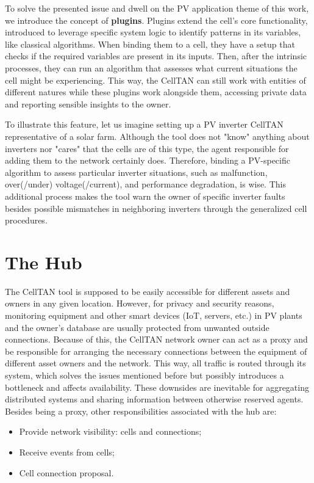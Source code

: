 To solve the presented issue and dwell on the PV application theme of this work, we introduce the concept of \textbf{plugins}. Plugins extend the cell's core functionality, introduced to leverage specific system logic to identify patterns in its variables, like classical algorithms. When binding them to a cell, they have a setup that checks if the required variables are present in its inputs. Then, after the intrinsic processes, they can run an algorithm that assesses what current situations the cell might be experiencing. This way, the CellTAN can still work with entities of different natures while these plugins work alongside them, accessing private data and reporting sensible insights to the owner. 

To illustrate this feature, let us imagine setting up a PV inverter CellTAN representative of a solar farm. Although the tool does not "know" anything about inverters nor "cares" that the cells are of this type, the agent responsible for adding them to the network certainly does. Therefore, binding a PV-specific algorithm to assess particular inverter situations, such as malfunction, over(/under) voltage(/current), and performance degradation, is wise. This additional process makes the tool warn the owner of specific inverter faults besides possible mismatches in neighboring inverters through the generalized cell procedures.

\section{The Hub}

The CellTAN tool is supposed to be easily accessible for different assets and owners in any given location. However, for privacy and security reasons, monitoring equipment and other smart devices (IoT, servers, etc.) in PV plants and the owner's database are usually protected from unwanted outside connections. Because of this, the CellTAN network owner can act as a proxy and be responsible for arranging the necessary connections between the equipment of different asset owners and the network. This way, all traffic is routed through its system, which solves the issues mentioned before but possibly introduces a bottleneck and affects availability. These downsides are inevitable for aggregating distributed systems and sharing information between otherwise reserved agents. Besides being a proxy, other responsibilities associated with the hub are:

\begin{itemize}
    \item Provide network visibility: cells and connections;
    \item Receive events from cells;
    \item Cell connection proposal.
\end{itemize}

